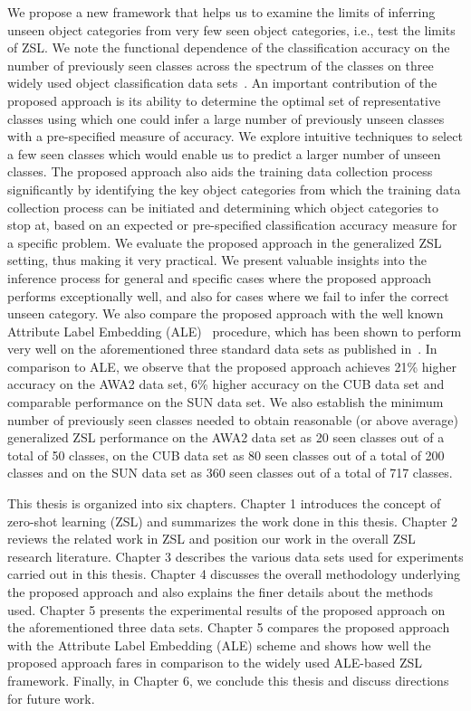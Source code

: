 \par
\medskip

We propose a new framework that helps us to examine the limits of inferring unseen object categories from very few seen object categories, i.e., test the limits of ZSL. We note the functional dependence of the classification accuracy on the number of previously seen classes across the spectrum of the classes on three widely used object classification data sets~\cite{awa,cub,sun}. An important contribution of the proposed approach is its ability to determine the optimal set of representative classes using which one could infer a large number of previously unseen classes with a pre-specified measure of accuracy. We explore intuitive techniques to select a few seen classes which would enable us to predict a larger number of unseen classes. The proposed approach also aids the training data collection process significantly by identifying the key object categories from which the training data collection process can be initiated and determining which object categories to stop at, based on an expected or pre-specified classification accuracy measure for a specific problem. We evaluate the proposed approach in the generalized ZSL setting, thus making it very practical. We present valuable insights into the inference process for general and specific cases where the proposed approach performs exceptionally well, and also for cases where we fail to infer the correct unseen category. We also compare the proposed approach with the well known Attribute Label Embedding (ALE)~\cite{ale} procedure, which has been shown to perform very well on the aforementioned three standard data sets as published in~\cite{gbu}. In comparison to ALE, we observe that the proposed approach achieves 21\% higher accuracy on the AWA2 data set, 6\% higher accuracy on the CUB data set and comparable performance on the SUN data set. We also establish the minimum number of previously seen classes needed to obtain reasonable (or above average) generalized ZSL performance on the AWA2 data set as 20 seen classes out of a total of 50 classes, on the CUB data set as 80 seen classes out of a total of 200 classes and on the SUN data set as 360 seen classes out of a total of 717 classes.

\par
\medskip

This thesis is organized into six chapters. Chapter 1 introduces the concept of zero-shot learning (ZSL) and summarizes the work done in this thesis. Chapter 2 reviews the related work in ZSL and position our work in the overall ZSL research literature. Chapter 3 describes the various data sets used for experiments carried out in this thesis. Chapter 4 discusses the overall methodology underlying the proposed approach and also explains the finer details about the methods used. Chapter 5 presents the experimental results of the proposed approach on the aforementioned three data sets. Chapter 5 compares the proposed approach with the Attribute Label Embedding (ALE) scheme and shows how well the proposed approach fares in comparison to the widely used ALE-based ZSL framework. Finally, in Chapter 6, we conclude this thesis and discuss directions for future work.